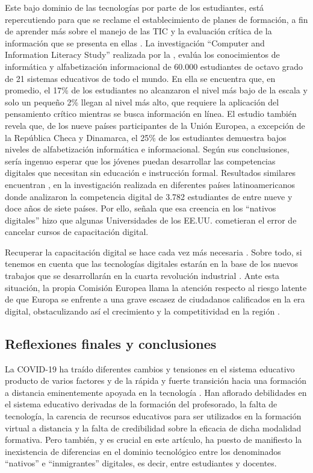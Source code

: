 \documentclass[spanish]{textolivre}
\begin{document}
Este bajo dominio de las tecnologías por parte de los estudiantes, está repercutiendo para que se reclame el establecimiento de planes de formación, a fin de aprender más sobre el manejo de las TIC y la evaluación crítica de la información que se presenta en ellas \cite{vsorgo2017attributes}. La investigación “Computer and Information Literacy Study” realizada por la \textcite{international2014}, evalúa los conocimientos de informática y alfabetización informacional de 60.000 estudiantes de octavo grado de 21 sistemas educativos de todo el mundo. En ella se encuentra que, en promedio, el 17\% de los estudiantes no alcanzaron el nivel más bajo de la escala y solo un pequeño 2\% llegan al nivel más alto, que requiere la aplicación del pensamiento crítico mientras se busca información en línea. El estudio también revela que, de los nueve países participantes de la Unión Europea, a excepción de la República Checa y Dinamarca, el 25\% de los estudiantes demuestra bajos niveles de alfabetización informática e informacional. Según sus conclusiones, sería ingenuo esperar que los jóvenes puedan desarrollar las competencias digitales que necesitan sin educación e instrucción formal. Resultados similares encuentran \textcite{garcia-ruiz_alfabetizacion_2020}, en la investigación realizada en diferentes países latinoamericanos donde analizaron la competencia digital de 3.782 estudiantes de entre nueve y doce años de siete países. Por ello, \textcite{denholm} señala que esa creencia en los “nativos digitales” hizo que algunas Universidades de los EE.UU. cometieran el error de cancelar cursos de capacitación digital.

Recuperar la capacitación digital se hace cada vez más necesaria \cite{calatayud2018formacion}. Sobre todo, si tenemos en cuenta que las tecnologías digitales estarán en la base de los nuevos trabajos que se desarrollarán en la cuarta revolución industrial \cite{oppenheimer_salvese_2018}. Ante esta situación, la propia Comisión Europea llama la atención respecto al riesgo latente de que Europa se enfrente a una grave escasez de ciudadanos calificados en la era digital, obstaculizando así el crecimiento y la competitividad en la región \cite{EuropeanCommission}.


\subsection{Reflexiones finales y conclusiones}

La COVID-19 ha traído diferentes cambios y tensiones en el sistema educativo producto de varios factores y de la rápida y fuerte transición hacia una formación a distancia eminentemente apoyada en la tecnología \cite{garcia_aretio_covid-19_2020}. Han aflorado debilidades en el sistema educativo derivadas de la formación del profesorado, la falta de tecnología, la carencia de recursos educativos para ser utilizados en la formación virtual a distancia y la falta de credibilidad sobre la eficacia de dicha modalidad formativa. Pero también, y es crucial en este artículo, ha puesto de manifiesto la inexistencia de diferencias en el dominio tecnológico entre los denominados “nativos” e “inmigrantes” digitales, es decir, entre estudiantes y docentes.
\end{document}
